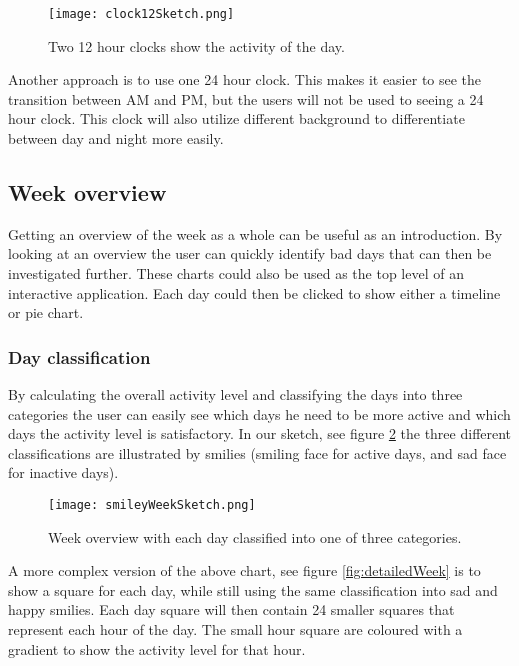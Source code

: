 \begin{figure}[h!]
	\centering
		\texttt{[image: clock12Sketch.png]}
		\caption{\footnotesize Two 12 hour clocks show the activity of the day.}
		\label{fig:clock12}
\end{figure}

Another approach is to use one 24 hour clock. This makes it easier to see the transition between AM and PM, but the users will not be used to seeing a 24 hour clock. This clock will also utilize different background to differentiate between day and night more easily.


\subsection{Week overview}
Getting an overview of the week as a whole can be useful as an introduction. By looking at an overview the user can quickly identify bad days that can then be investigated further. These charts could also be used as the top level of an interactive application. Each day could then be clicked to show either a timeline or pie chart. 

\subsubsection{Day classification}
By calculating the overall activity level and classifying the days into three categories the user can easily see which days he need to be more active and which days the activity level is satisfactory. In our sketch, see figure \ref{fig:smileyWeek} the three different classifications are illustrated by smilies (smiling face for active days, and sad face for inactive days).

\begin{figure}[h!]
	\centering
		\texttt{[image: smileyWeekSketch.png]}
		\caption{\footnotesize Week overview with each day classified into one of three categories.}
		\label{fig:smileyWeek}
\end{figure}

A more complex version of the above chart, see figure \ref{fig:detailedWeek} is to show a square for each day, while still using the same classification into sad and happy smilies. Each day square will then contain 24 smaller squares that represent each hour of the day. The small hour square are coloured with a gradient to show the activity level for that hour.

